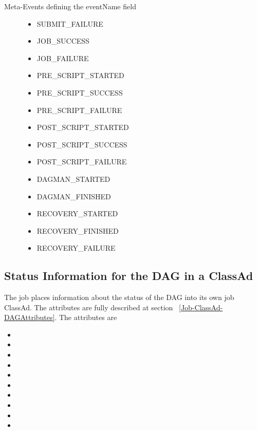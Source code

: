 \begin{description}
\item[Meta-Events defining the eventName field]
\begin{itemize}
\item SUBMIT\_FAILURE
\item JOB\_SUCCESS
\item JOB\_FAILURE
\item PRE\_SCRIPT\_STARTED
\item PRE\_SCRIPT\_SUCCESS
\item PRE\_SCRIPT\_FAILURE
\item POST\_SCRIPT\_STARTED
\item POST\_SCRIPT\_SUCCESS
\item POST\_SCRIPT\_FAILURE
\item DAGMAN\_STARTED
\item DAGMAN\_FINISHED
\item RECOVERY\_STARTED
\item RECOVERY\_FINISHED
\item RECOVERY\_FAILURE
\end{itemize}
\end{description}


\subsection{\label{sec:DAGStatusClassad}Status Information for the DAG in a ClassAd}
\label{Job-ClassAd-DAGAttributes}

The  job places information about the status of the DAG
into its own job ClassAd.  
The attributes are fully described at
section ~\ref{Job-ClassAd-DAGAttributes}.
The attributes are

\begin{itemize}
\item {}
\item {}
\item {}
\item {}
\item {}
\item {}
\item {}
\item {}
\item {}
\item {}
\end{itemize}

